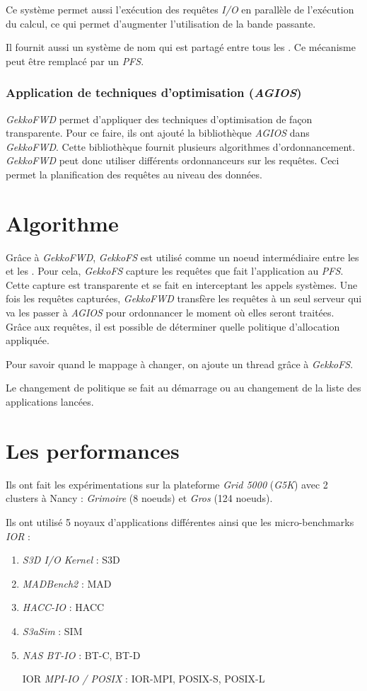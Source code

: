 \documentclass[10pt, a4paper]{article}
\begin{document}
Ce système permet aussi l'exécution des requêtes \emph{I/O} en parallèle de l'exécution du calcul, ce qui permet d'augmenter l'utilisation de la bande passante.

Il fournit aussi un système de nom qui est partagé entre tous les \noeudsDeCalculs{}. Ce mécanisme peut être remplacé par un \emph{PFS}.

\subsubsection{Application de techniques d'optimisation (\emph{AGIOS})}

\emph{GekkoFWD} permet d'appliquer des techniques d'optimisation de façon transparente. Pour ce faire, ils ont ajouté la bibliothèque \emph{AGIOS} dans \emph{GekkoFWD}. Cette bibliothèque fournit plusieurs algorithmes d'ordonnancement.
\emph{GekkoFWD} peut donc utiliser différents ordonnanceurs sur les requêtes. Ceci permet la planification des requêtes au niveau des données.

\section{Algorithme}

Grâce à \emph{GekkoFWD}, \emph{GekkoFS} est utilisé comme un noeud intermédiaire entre les \noeudsDeCalculs{} et les \noeudsIO{}. Pour cela, \emph{GekkoFS} capture les requêtes que fait l'application au \emph{PFS}. Cette capture est transparente et se fait en interceptant les appels systèmes. Une fois les requêtes capturées, \emph{GekkoFWD} transfère les requêtes à un seul serveur qui va les passer à \emph{AGIOS} pour ordonnancer le moment où elles seront traitées. Grâce aux requêtes, il est possible de déterminer quelle politique d'allocation appliquée.

Pour savoir quand le mappage à changer, on ajoute un thread grâce à \emph{GekkoFS}.

Le changement de politique se fait au démarrage ou au changement de la liste des applications lancées.

\section{Les performances}

Ils ont fait les expérimentations sur la plateforme \emph{Grid 5000} (\emph{G5K}) avec 2 clusters à Nancy : \emph{Grimoire} (8 noeuds) et \emph{Gros} (124 noeuds).

Ils ont utilisé 5 noyaux d'applications différentes ainsi que les micro-benchmarks \emph{IOR} :
\begin{enumerate}
  \item \emph{S3D I/O Kernel} : S3D
  \item \emph{MADBench2} : MAD
  \item \emph{HACC-IO} : HACC
  \item \emph{S3aSim} : SIM
  \item \emph{NAS BT-IO} : BT-C, BT-D
  \item [IOR] \emph{MPI-IO / POSIX} : IOR-MPI, POSIX-S, POSIX-L
\end{enumerate}
\end{document}
